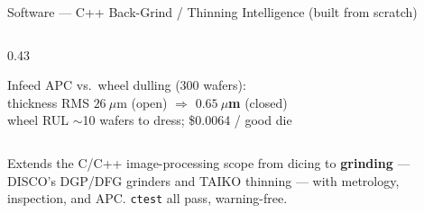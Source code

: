 \documentclass[aspectratio=169,11pt]{beamer}
\begin{document}
\begin{frame}[shrink=10]{Software --- C++ Back-Grind / Thinning Intelligence (built from scratch)}
\begin{columns}[T]
\begin{column}{0.43\textwidth}
      \vspace{0.3em}
      \begin{block}{}
        \footnotesize
        Infeed APC vs.\ wheel dulling (300 wafers):\\
        thickness RMS $26~\mu$m (open) $\Rightarrow$
          \textcolor{discoblue}{\textbf{$0.65~\mu$m}} (closed)\\
        wheel RUL $\sim$10 wafers to dress; \$0.0064 / good die
      \end{block}
    \end{column}
  \end{columns}
  \vspace{0.2em}
  {\footnotesize\textcolor{discogray}{Extends the C/C++ image-processing scope from
    dicing to \textbf{grinding} --- DISCO's DGP/DFG grinders and TAIKO thinning ---
    with metrology, inspection, and APC. \texttt{ctest} all pass, warning-free.}}
\end{frame}
\end{document}
